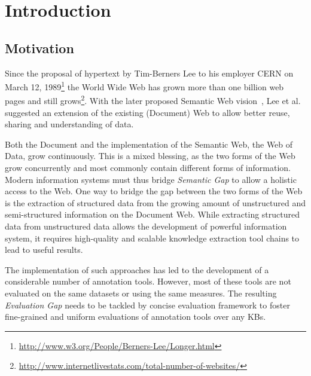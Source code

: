 \chapter{Introduction}

\section*{Motivation}

Since the proposal of hypertext by Tim-Berners Lee to his employer CERN on March 12, 1989\footnote{\url{http://www.w3.org/People/Berners-Lee/Longer.html}} the World Wide Web has grown more than one billion web pages and still grows\footnote{\url{http://www.internetlivestats.com/total-number-of-websites/}}.
With the later proposed Semantic Web vision~\cite{bernerslee2001semantic}, Lee et al. suggested an extension of the existing (Document) Web to allow better reuse, sharing and understanding of data.

Both the Document and the implementation of the Semantic Web, the Web of Data, grow continuously. 
This is a mixed blessing, as the two forms of the Web grow concurrently and most commonly contain different forms of information. 
Modern information systems must thus bridge \emph{Semantic Gap} to allow a holistic access to the Web. 
One way to bridge the gap between the two forms of the Web is the extraction of structured data from the growing amount of unstructured and semi-structured information on the Document Web. 
While extracting structured data from unstructured data allows the development of powerful information system, it requires high-quality and scalable knowledge extraction tool chains to lead to useful results. 

The implementation of such approaches has led to the development of a considerable number of annotation tools. 
However, most of these tools are not evaluated on the same datasets or using the same measures.
The resulting \emph{Evaluation Gap} needs to be tackled by concise evaluation framework to foster fine-grained and uniform evaluations of annotation tools over any \ac{KB}s.

